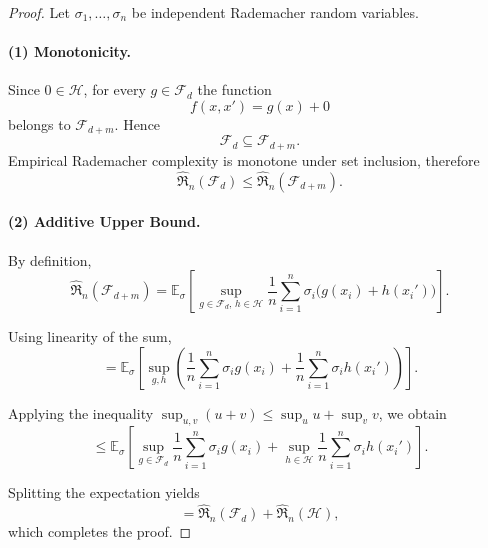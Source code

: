 \documentclass{article}
\begin{document}
\begin{proof}
Let $\sigma_1, \dots, \sigma_n$ be independent Rademacher random variables.

\paragraph{(1) Monotonicity.}
Since $0 \in \mathcal{H}$, for every $g \in \mathcal{F}_d$ the function
\[
f(x,x') = g(x) + 0
\]
belongs to $\mathcal{F}_{d+m}$. Hence
\[
\mathcal{F}_d \subseteq \mathcal{F}_{d+m}.
\]
Empirical Rademacher complexity is monotone under set inclusion, therefore
\[
\hat{\mathfrak{R}}_n(\mathcal{F}_d)
\le
\hat{\mathfrak{R}}_n(\mathcal{F}_{d+m}).
\]

\paragraph{(2) Additive Upper Bound.}
By definition,
\[
\hat{\mathfrak{R}}_n(\mathcal{F}_{d+m})
=
\mathbb{E}_\sigma
\left[
\sup_{g \in \mathcal{F}_d,\, h \in \mathcal{H}}
\frac{1}{n}
\sum_{i=1}^n
\sigma_i
\big(g(x_i) + h(x_i')\big)
\right].
\]

Using linearity of the sum,
\[
=
\mathbb{E}_\sigma
\left[
\sup_{g,h}
\left(
\frac{1}{n} \sum_{i=1}^n \sigma_i g(x_i)
+
\frac{1}{n} \sum_{i=1}^n \sigma_i h(x_i')
\right)
\right].
\]

Applying the inequality $\sup_{u,v}(u+v) \le \sup_u u + \sup_v v$, we obtain
\[
\le
\mathbb{E}_\sigma
\left[
\sup_{g \in \mathcal{F}_d}
\frac{1}{n} \sum_{i=1}^n \sigma_i g(x_i)
+
\sup_{h \in \mathcal{H}}
\frac{1}{n} \sum_{i=1}^n \sigma_i h(x_i')
\right].
\]

Splitting the expectation yields
\[
=
\hat{\mathfrak{R}}_n(\mathcal{F}_d)
+
\hat{\mathfrak{R}}_n(\mathcal{H}),
\]
which completes the proof.
\end{proof}
\end{document}
